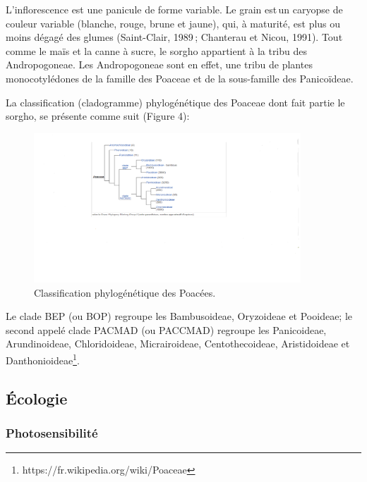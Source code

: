 \documentclass[a4paper,11pt]{article}
\begin{document}
 
\newpage



L’inflorescence est une panicule de forme variable. Le grain est\,un
caryopse de couleur variable (blanche, rouge, brune et jaune), qui, à
maturité, est plus ou moins dégagé des glumes (Saint-Clair, 1989\,;
Chanterau et Nicou, 1991).  Tout comme le maïs et la canne à sucre, le
sorgho appartient à la tribu des Andropogoneae. Les Andropogoneae sont
en effet, une tribu de plantes monocotylédones de la famille des
Poaceae et de la sous-famille des Panicoïdeae.

La classification (cladogramme) phylogénétique des Poaceae dont fait
partie le sorgho, se présente comme suit (Figure 4):



\begin{figure}%
  \begin{center}
    \includegraphics[width=10cm]{images/PhylogenyPoacea}
  \end{center}
\caption{Classification phylogénétique des Poacées.}
\end{figure}


Le clade BEP (ou BOP) regroupe les Bambusoideae, Oryzoideae et
Pooideae; le second appelé clade PACMAD (ou PACCMAD) regroupe les
Panicoideae, Arundinoideae, Chloridoideae, Micrairoideae,
Centothecoideae, Aristidoideae et
Danthonioideae\footnote{https://fr.wikipedia.org/wiki/Poaceae}.

\subsection{Écologie}

\subsubsection{Photosensibilité}
\end{document}
